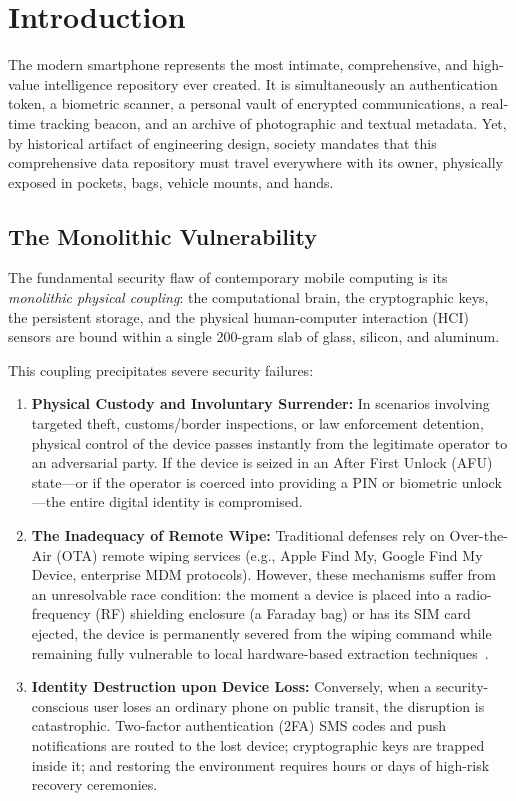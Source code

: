 \section{Introduction}
\label{sec:introduction}

The modern smartphone represents the most intimate, comprehensive, and high-value intelligence repository ever created. It is simultaneously an authentication token, a biometric scanner, a personal vault of encrypted communications, a real-time tracking beacon, and an archive of photographic and textual metadata. Yet, by historical artifact of engineering design, society mandates that this comprehensive data repository must travel everywhere with its owner, physically exposed in pockets, bags, vehicle mounts, and hands.

\subsection{The Monolithic Vulnerability}
The fundamental security flaw of contemporary mobile computing is its \textit{monolithic physical coupling}: the computational brain, the cryptographic keys, the persistent storage, and the physical human-computer interaction (HCI) sensors are bound within a single 200-gram slab of glass, silicon, and aluminum. 

This coupling precipitates severe security failures:
\begin{enumerate}[label=(\roman*)]
    \item \textbf{Physical Custody and Involuntary Surrender:} In scenarios involving targeted theft, customs/border inspections, or law enforcement detention, physical control of the device passes instantly from the legitimate operator to an adversarial party. If the device is seized in an After First Unlock (AFU) state—or if the operator is coerced into providing a PIN or biometric unlock—the entire digital identity is compromised.
    \item \textbf{The Inadequacy of Remote Wipe:} Traditional defenses rely on Over-the-Air (OTA) remote wiping services (e.g., Apple Find My, Google Find My Device, enterprise MDM protocols). However, these mechanisms suffer from an unresolvable race condition: the moment a device is placed into a radio-frequency (RF) shielding enclosure (a Faraday bag) or has its SIM card ejected, the device is permanently severed from the wiping command while remaining fully vulnerable to local hardware-based extraction techniques~\cite{casey2011digital, nist800101r1}.
    \item \textbf{Identity Destruction upon Device Loss:} Conversely, when a security-conscious user loses an ordinary phone on public transit, the disruption is catastrophic. Two-factor authentication (2FA) SMS codes and push notifications are routed to the lost device; cryptographic keys are trapped inside it; and restoring the environment requires hours or days of high-risk recovery ceremonies.
\end{enumerate}


